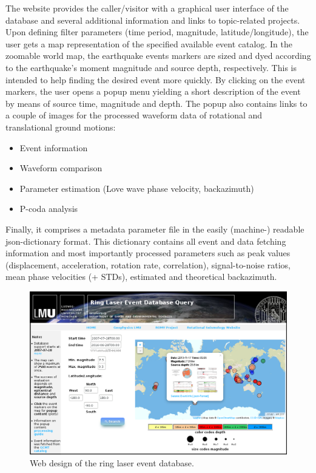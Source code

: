 \documentclass[12pt,reqno,letter]{article} %
\begin{document}
The website provides the caller/visitor with a graphical user interface of the database and several additional information and links to topic-related projects.
Upon defining filter parameters (time period, magnitude, latitude/longitude), the user gets a map representation of the specified available event catalog.  In the zoomable world map, the earthquake events markers are sized and dyed according to the earthquake’s moment magnitude and source depth, respectively. This is intended to help finding the desired event more quickly.
By clicking on the event markers, the user opens a popup menu yielding a short description of the event by means of source time, magnitude and depth. The popup also contains links to a couple of images for the processed waveform data of rotational and translational ground motions:

\begin{itemize}
	\item Event information
	\item Waveform comparison
	\item Parameter estimation (Love wave phase velocity, backazimuth)
	\item P-coda analysis
\end{itemize}
\noindent
Finally, it comprises a metadata parameter file in the easily (machine-) readable json-dictionary format. This dictionary contains all event and data fetching information and most importantly processed parameters such as  peak values (displacement, acceleration, rotation rate, correlation), signal-to-noise ratios, mean phase velocities (+ STDs), estimated and theoretical backazimuth.
\begin{figure}[!htp]
\centering
\includegraphics[width=\textwidth]{webpage_framed.png}
\caption{Web design of the ring laser event database.}
\label{fig:website}
\end{figure}
\end{document}
